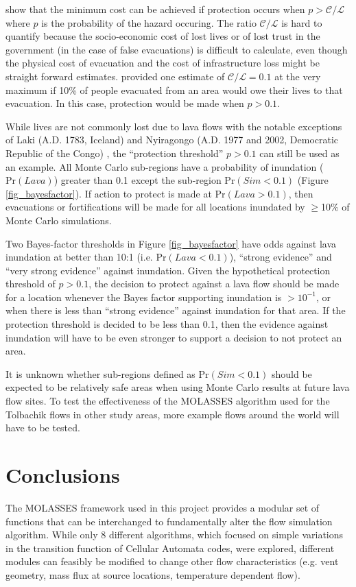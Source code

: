 	\citet{marzocchi2007probabilistic} show that the minimum cost can be achieved if protection occurs when $p>\mathcal{C}/\mathcal{L}$ where $p$ is the probability of the hazard occuring. The ratio $\mathcal{C}/\mathcal{L}$ is hard to quantify because the socio-economic cost of lost lives or of lost trust in the government (in the case of false evacuations) is difficult to calculate, even though the physical cost of evacuation and the cost of infrastructure loss might be straight forward estimates. \citet{woo2008probabilistic} provided one estimate of $\mathcal{C}/\mathcal{L}=0.1$ at the very maximum if 10\% of people evacuated from an area would owe their lives to that evacuation. In this case, protection would be made when $p>0.1$.
	
	While lives are not commonly lost due to lava flows with the notable exceptions of Laki (A.D. 1783, Iceland) and Nyiragongo (A.D. 1977 and 2002, Democratic Republic of the Congo) \citep{peterson2000lava}, the ``protection threshold'' $p>0.1$ can still be used as an example. All Monte Carlo sub-regions have a probability of inundation ($\text{Pr}(Lava)$) greater than 0.1 except the sub-region $\text{Pr}(Sim<0.1)$ (Figure \ref{fig_bayesfactor}). If action to protect is made at $\text{Pr}(Lava>0.1)$, then evacuations or fortifications will be made for all locations inundated by $\ge$10\% of Monte Carlo simulations.
	
	Two Bayes-factor thresholds in Figure \ref{fig_bayesfactor} have odds against lava inundation at better than 10:1 (i.e. $\text{Pr}(Lava<0.1)$), ``strong evidence'' and ``very strong evidence'' against inundation. Given the hypothetical protection threshold of $p>0.1$, the decision to protect against a lava flow should be made for a location whenever the Bayes factor supporting inundation is $>10^{-1}$, or when there is less than ``strong evidence'' against inundation for that area. If the protection threshold is decided to be less than 0.1, then the evidence against inundation will have to be even stronger to support a decision to not protect an area. 
	
	It is unknown whether sub-regions defined as $\text{Pr}(Sim<0.1)$ should be expected to be relatively safe areas when using Monte Carlo results at future lava flow sites. To test the effectiveness of the MOLASSES algorithm used for the Tolbachik flows in other study areas, more example flows around the world will have to be tested.
		
		
\section{Conclusions}
	The MOLASSES framework used in this project provides a modular set of functions that can be interchanged to fundamentally alter the flow simulation algorithm. While only 8 different algorithms, which focused on simple variations in the transition function of Cellular Automata codes, were explored, different modules can feasibly be modified to change other flow characteristics (e.g. vent geometry, mass flux at source locations, temperature dependent flow).
	
